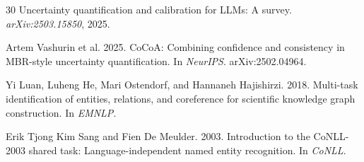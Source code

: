 \documentclass[11pt,a4paper]{article}
\begin{document}
\begin{thebibliography}{30}
Uncertainty quantification and calibration for LLMs: A survey.
\newblock \emph{arXiv:2503.15850}, 2025.

Artem Vashurin et al. 2025.
\newblock CoCoA: Combining confidence and consistency in MBR-style uncertainty quantification.
\newblock In \emph{NeurIPS}. arXiv:2502.04964.

Yi Luan, Luheng He, Mari Ostendorf, and Hannaneh Hajishirzi. 2018.
\newblock Multi-task identification of entities, relations, and coreference for scientific knowledge graph construction.
\newblock In \emph{EMNLP}.

Erik Tjong Kim Sang and Fien De Meulder. 2003.
\newblock Introduction to the CoNLL-2003 shared task: Language-independent named entity recognition.
\newblock In \emph{CoNLL}.

\end{thebibliography}
\end{document}
